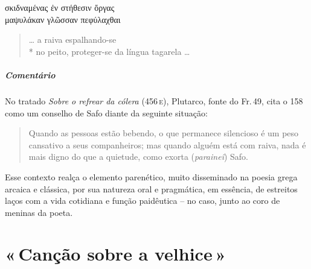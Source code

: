 {\begin{gkverse}
σκιδναμένας ἐν στήθεσιν ὄργας\\
μαψυλάκαν γλῶσσαν πεφύλαχθαι
\end{gkverse}

\begin{verse}
\ldots{} a raiva espalhando-se \\*
no peito, proteger-se da língua tagarela \ldots{}
\end{verse}

\medskip

{\paragraph{Comentário} No tratado \textit{Sobre o refrear da cólera} (456\,\textsc{e}), Plutarco, fonte do Fr.\,49, cita o 158 como um conselho de Safo diante da seguinte situação:

\begin{quote}
Quando as pessoas estão bebendo, o que permanece silencioso é um peso
cansativo a seus companheiros; mas quando alguém está com raiva, nada é mais
digno do que a quietude, como exorta (\textit{paraineî}) Safo. 
\end{quote}}

Esse contexto realça o elemento parenético, muito disseminado na poesia grega arcaica e clássica, por sua natureza oral e pragmática, em essência, de estreitos laços com a vida cotidiana e função paidêutica -- no caso, junto ao coro de meninas da poeta.

\chapter{«\,Canção sobre a velhice\,»}

}
